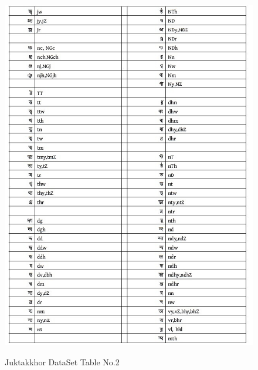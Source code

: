 \documentclass[12pt,oneside,openany,a4paper]{book}
\begin{document}
\begin{figure}
		\caption{Juktakkhor DataSet Table No.2}
		\centering
		\includegraphics[scale=0.7]{data2}
		\label{fig:data2}
\end{figure}
\end{document}
